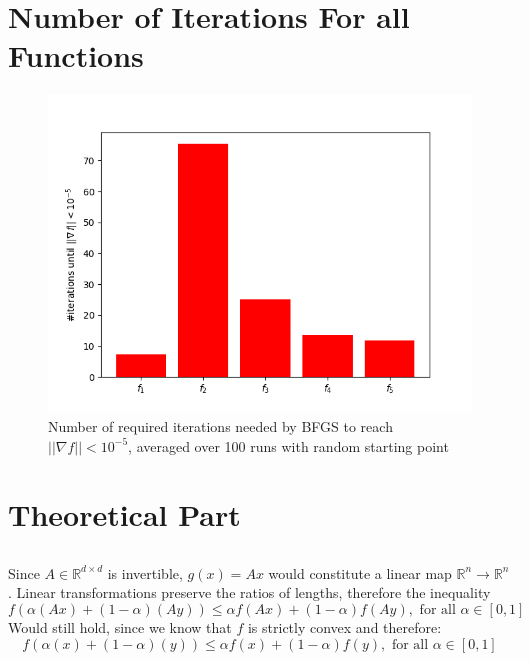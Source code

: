 \documentclass[a4paper]{article}
\begin{document}
\section{Number of Iterations For all Functions}
\label{sec:label}
\begin{figure}[H]
  \centering
  \includegraphics[width=\textwidth]{hist.png}
  \caption{Number of required iterations needed by BFGS to reach $||\nabla f|| < 10^{-5}$, averaged over 100 runs with random starting point}
  \label{plt2}
\end{figure}

\section{Theoretical Part}
\subsection{}
\subsubsection{}
Since $A \in \mathbb{R}^{d\times d}$ is invertible, $g(x) = Ax$ would constitute a linear map
$\mathbb{R}^n \rightarrow \mathbb{R}^n$. Linear transformations preserve the
ratios of lengths, therefore the inequality
\[
f(\alpha(A x)+(1-\alpha)(A y)) \leq \alpha f(A x)+(1-\alpha) f(A y), \text { for all } \alpha \in[0,1]
\]
Would still hold, since we know that $f$ is strictly convex and therefore:
\[
f(\alpha(x)+(1-\alpha)(y)) \leq \alpha f(x)+(1-\alpha) f(y), \text { for all } \alpha \in[0,1]
\]
\end{document}
